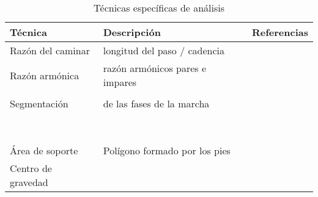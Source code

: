 \begin{table}
    \centering
    \caption{Técnicas específicas de análisis}
    \label{tab:tec-especificas}
    \begin{tabular}{lll}
        \toprule
        Técnica & Descripción & Referencias \\
        \midrule
        Razón del caminar & longitud del paso / cadencia & \cite{menz} \\
        Razón armónica    & razón armónicos pares e impares & \cite{menz} \\
                          & & \cite{latt} \\
        Segmentación      & de las fases de la marcha       & \cite{cuaya} \\
                          & & \cite{franklin} \\
                          & & \cite{wu} \\
                          & & \cite{forneris} \\
                          & & \cite{muro} \\
                          & & \cite{senanayake} \\
                          & & \cite{prakash} \\
                          & & \cite{gong} \\
                          & & \cite{hu} \\
        Área de soporte   & Polígono formado por los pies & \cite{mrozowski} \\
        Centro de gravedad & & \cite{mrozowski} \\
        \bottomrule
    \end{tabular}
\end{table}


